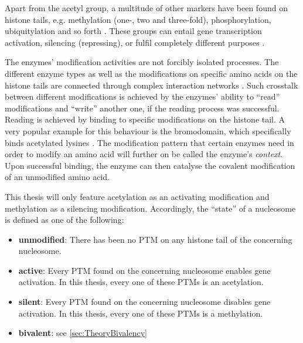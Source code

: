             Apart from the acetyl group, a multitude of other markers have been found on histone tails, e.g. methylation (one-, two and three-fold), phosphorylation, ubiquitylation and so forth \cite{bannister2011regulation}. These groups can entail gene transcription activation, silencing (repressing), or fulfil completely different purposes \cite{rossetto2012histone,wang2006histone}. %

            The enzymes' modification activities are not forcibly isolated processes. The different enzyme types as well as the modifications on specific amino acids on the histone tails are connected through complex interaction networks \cite{zhang2015interplay, musselman2012perceiving, ge2019nucleation}. Such crosstalk between different modifications is achieved by the enzymes' ability to “read” modifications and “write” another one, if the reading process was successful. Reading is achieved by binding to specific modifications on the histone tail. A very popular example for this behaviour is the bromodomain, which specifically binds acetylated lysines \cite{zeng2002bromodomain}. The modification pattern that certain enzymes need in order to modify an amino acid will further on be called the enzyme's \textit{context}. Upon successful binding, the enzyme can then catalyse the covalent modification of an unmodified amino acid.

            This thesis will only feature acetylation as an activating modification and methylation as a silencing modification. Accordingly, the “state” of a nucleosome is defined as one of the following:

            \begin{itemize}
                \item \textbf{unmodified}: There has been no PTM on any histone tail of the concerning nucleosome.
                \item \textbf{active}: Every PTM found on the concerning nucleosome enables gene activation. In this thesis, every one of these PTMs is an acetylation.
                \item \textbf{silent}: Every PTM found on the concerning nucleosome disables gene activation. In this thesis, every one of these PTMs is a methylation.
                \item \textbf{bivalent}: see \ref{sec:TheoryBivalency}
            \end{itemize}
